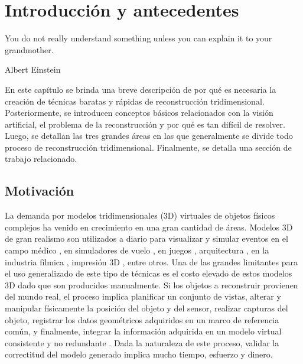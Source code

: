 \chapter{Introducci\'{o}n y antecedentes}
\epigraph{You do not really understand something unless you can explain it to your grandmother.}{Albert Einstein}

En este cap\'{i}tulo se brinda una breve descripci\'{o}n de por qu\'{e} es necesaria la creaci\'{o}n de t\'{e}cnicas baratas y r\'{a}pidas de reconstrucci\'{o}n tridimensional. Posteriormente, se introducen conceptos b\'{a}sicos relacionados con la visi\'{o}n artificial, el problema de la reconstrucci\'{o}n y por qu\'{e} es tan dif\'{i}cil de resolver. Luego, se detallan las tres grandes \'{a}reas en las que generalmente se divide todo proceso de reconstrucci\'{o}n tridimensional. Finalmente, se detalla una secci\'{o}n de trabajo relacionado.


\section{Motivaci\'{o}n}
La demanda por modelos tridimensionales (3D) virtuales de objetos f\'{i}sicos complejos ha venido en crecimiento en una gran cantidad de \'{a}reas. Modelos 3D de gran realismo son utilizados a diario para visualizar y simular eventos en el campo m\'{e}dico \cite{McInerney_Terzopoulos_1996,Chen_Hou_Gou_Lu_2000}, en simuladores de vuelo \cite{Baarspul_1990}, en juegos \cite{Freeman_Tanaka_Ohta_Kyuma_1996}, arquitectura \cite{Werner_Zisserman_2002}, en la industria f\'{i}lmica \cite{wiki:Walle}, impresi\'{o}n 3D \cite{japanese1996jtec}, entre otros. Una de las grandes limitantes para el uso generalizado de este tipo de t\'{e}cnicas es el costo elevado de estos modelos 3D dado que son producidos manualmente. Si los objetos a reconstruir provienen del mundo real, el proceso implica planificar un conjunto de vistas, alterar y manipular f\'{i}sicamente la posici\'{o}n del objeto y del sensor, realizar capturas del objeto, registrar los datos geom\'{e}tricos adquiridos en un marco de referencia com\'{u}n, y finalmente, integrar la informaci\'{o}n adquirida en un modelo virtual consistente y no redundante \cite{Jahne_Haussecker_Geibler_1999,Faugeras_1993,Faugeras_Luong_2001,Szeliski_2010}. Dada la naturaleza de este proceso, validar la correctitud del modelo generado implica mucho tiempo, esfuerzo y dinero.

